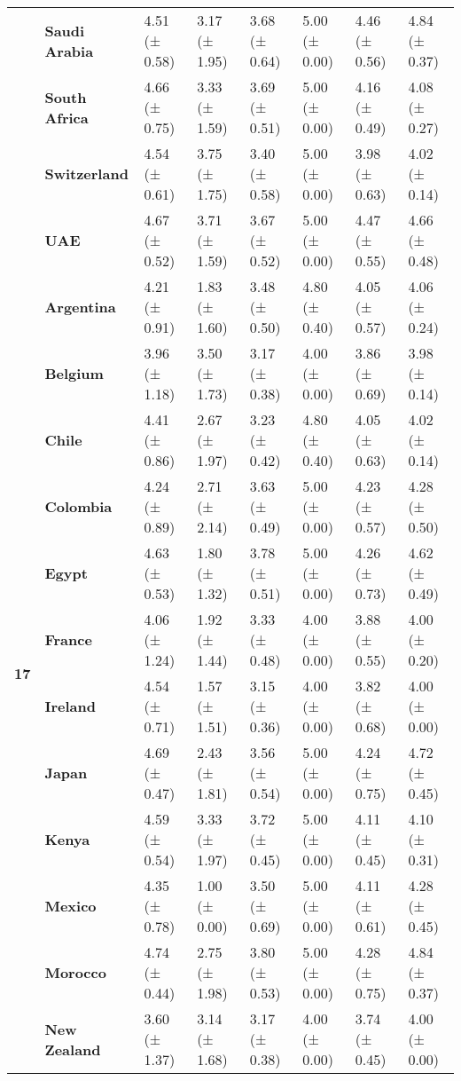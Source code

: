 \begin{longtable}{llllllll}
\textbf{} & \textbf{Saudi Arabia} & 4.51 (± 0.58) & 3.17 (± 1.95) & 3.68 (± 0.64) & 5.00 (± 0.00) & 4.46 (± 0.56) & 4.84 (± 0.37) \\
\textbf{} & \textbf{South Africa} & 4.66 (± 0.75) & 3.33 (± 1.59) & 3.69 (± 0.51) & 5.00 (± 0.00) & 4.16 (± 0.49) & 4.08 (± 0.27) \\
\textbf{} & \textbf{Switzerland} & 4.54 (± 0.61) & 3.75 (± 1.75) & 3.40 (± 0.58) & 5.00 (± 0.00) & 3.98 (± 0.63) & 4.02 (± 0.14) \\
\textbf{} & \textbf{UAE} & 4.67 (± 0.52) & 3.71 (± 1.59) & 3.67 (± 0.52) & 5.00 (± 0.00) & 4.47 (± 0.55) & 4.66 (± 0.48) \\
\cline{1-8}
\multirow[t]{19}{*}{\textbf{17}} & \textbf{Argentina} & 4.21 (± 0.91) & 1.83 (± 1.60) & 3.48 (± 0.50) & 4.80 (± 0.40) & 4.05 (± 0.57) & 4.06 (± 0.24) \\
\textbf{} & \textbf{Belgium} & 3.96 (± 1.18) & 3.50 (± 1.73) & 3.17 (± 0.38) & 4.00 (± 0.00) & 3.86 (± 0.69) & 3.98 (± 0.14) \\
\textbf{} & \textbf{Chile} & 4.41 (± 0.86) & 2.67 (± 1.97) & 3.23 (± 0.42) & 4.80 (± 0.40) & 4.05 (± 0.63) & 4.02 (± 0.14) \\
\textbf{} & \textbf{Colombia} & 4.24 (± 0.89) & 2.71 (± 2.14) & 3.63 (± 0.49) & 5.00 (± 0.00) & 4.23 (± 0.57) & 4.28 (± 0.50) \\
\textbf{} & \textbf{Egypt} & 4.63 (± 0.53) & 1.80 (± 1.32) & 3.78 (± 0.51) & 5.00 (± 0.00) & 4.26 (± 0.73) & 4.62 (± 0.49) \\
\textbf{} & \textbf{France} & 4.06 (± 1.24) & 1.92 (± 1.44) & 3.33 (± 0.48) & 4.00 (± 0.00) & 3.88 (± 0.55) & 4.00 (± 0.20) \\
\textbf{} & \textbf{Ireland} & 4.54 (± 0.71) & 1.57 (± 1.51) & 3.15 (± 0.36) & 4.00 (± 0.00) & 3.82 (± 0.68) & 4.00 (± 0.00) \\
\textbf{} & \textbf{Japan} & 4.69 (± 0.47) & 2.43 (± 1.81) & 3.56 (± 0.54) & 5.00 (± 0.00) & 4.24 (± 0.75) & 4.72 (± 0.45) \\
\textbf{} & \textbf{Kenya} & 4.59 (± 0.54) & 3.33 (± 1.97) & 3.72 (± 0.45) & 5.00 (± 0.00) & 4.11 (± 0.45) & 4.10 (± 0.31) \\
\textbf{} & \textbf{Mexico} & 4.35 (± 0.78) & 1.00 (± 0.00) & 3.50 (± 0.69) & 5.00 (± 0.00) & 4.11 (± 0.61) & 4.28 (± 0.45) \\
\textbf{} & \textbf{Morocco} & 4.74 (± 0.44) & 2.75 (± 1.98) & 3.80 (± 0.53) & 5.00 (± 0.00) & 4.28 (± 0.75) & 4.84 (± 0.37) \\
\textbf{} & \textbf{New Zealand} & 3.60 (± 1.37) & 3.14 (± 1.68) & 3.17 (± 0.38) & 4.00 (± 0.00) & 3.74 (± 0.45) & 4.00 (± 0.00) \\

\end{longtable}
